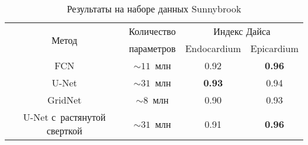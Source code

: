 \begin{table}[h]
\begin{center}
    \caption{Результаты на наборе данных Sunnybrook} \label{tab:sunnybrook_results}
    \begin{tabular}{ |c||*{3}{c|} }
      \hline
      \multirow{2}{*}{Метод}      & Количество   & \multicolumn{2}{c|}{Индекс Дайса} \\ \cline{3-4}
                                  & параметров   & Endocardium   & Epicardium        \\ \hline
      \hline
      FCN                         & $\sim11$~млн & 0.92          & \textbf{0.96}     \\ \hline
      U-Net                       & $\sim31$~млн & \textbf{0.93} & 0.94              \\ \hline
      GridNet                     &  $\sim8$~млн & 0.90          & 0.93              \\ \hline
      U-Net с~растянутой сверткой & $\sim31$~млн & 0.91          & \textbf{0.96}     \\ 
      \hline
    \end{tabular}
  \end{center}
\end{table}
